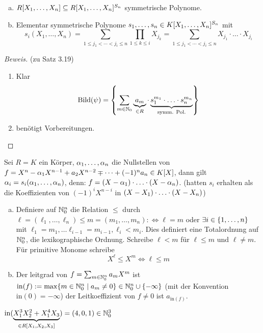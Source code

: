 \documentclass[a4paper]{report}
\begin{document}
\begin{whg*}\item
\begin{enumerate}[(a)]
  \item $R[X_{1}, \ldots, X_{n}] \subseteq R[X_{1}, \ldots, X_{n}]^{S_n}$ symmetrische Polynome.
  \item Elementar symmetrische Polynome $s_{1}, \ldots, s_{n} \in K[X_{1}, \ldots, X_{n}]^{S_n}$ mit \[s_{i}(X_{1}, \ldots, X_{n}) = \sum_{1 \le j_{1} < \cdots < j_{i} \le n}\prod_{1 \le k \le i}X_{j_{k}} = \sum_{1 \le j_{1} < \cdots < j_{i} \le n}X_{j_{1}}\cdot \ldots \cdot X_{j_{i}}\]
\end{enumerate}
\end{whg*}

\begin{proof}[Beweis](zu Satz 3.19)
\begin{enumerate}[{Teil} (a)]
  \item Klar
        \[\operatorname{Bild}(\psi) = \left\{ \sum_{m \in \mathbb{N}_0} \underbrace{a_{m}}_{\in R} \cdot \underbrace{s_{1}^{m_{1}}\cdot \ldots \cdot s_{n}^{m_{n}}}_{\text{symm. Pol.}} \right\}\]
  \item benötigt Vorbereitungen.
\end{enumerate}
\end{proof}

\begin{bem*}
Sei $R = K$ ein Körper, $\alpha_{1}, \ldots, \alpha_{n}$ die Nullstellen von $f = X^n - \alpha_{1}X^{n-1} + a_{2}X^{n-2} \mp \cdots + (-1)^{n}a_{n} \in K[X]$, dann gilt $\alpha_{i} = s_{i}(\alpha_{1}, \ldots, \alpha_{n})$, denn: $f = (X-\alpha_{1})\cdot \ldots \cdot (X-\alpha_{n})$. (hatten $s_{i}$ erhalten als die Koeffizienten von $(-1)^iX^{n-i}$ in $(X-X_{1})\cdot \ldots \cdot (X-X_{n})$)
\end{bem*}

\begin{defi}\item
\begin{enumerate}[(a)]
  \item Definiere auf $\mathbb{N}_0^{n}$ die Relation $\le$ durch $\ell = (\ell_{1}, \ldots, \ell_{n}) \le m = (m_{1}, \ldots, m_{n}) :\iff \ell = m$ oder $\exists i \in \{1, \ldots, n\}$ mit $\ell_{1} = m_{1}, \ldots \ell_{i-1} = m_{i-1}, \ell_{i} < m_{i}$. Dies definiert eine Totalordnung auf $\mathbb{N}_0^{n}$, die lexikographische Ordnung. Schreibe $\ell < m$ für $\ell \le m$ und $\ell \ne m$. Für primitive Monome schreibe
        \[X^{\ell} \le X^{m} \iff \ell \le m\]
  \item Der leitgrad von $f = \sum_{m \in \mathbb{N}_0^{n}}a_{m}X^{m}$ ist $\mathrm{in}(f):= \max \{m\in \mathbb{N}_0^{n} \mid a_{m} \ne 0\} \in \mathbb{N}_0^{n} \cup \{-\infty\}$ (mit der Konvention $\mathrm{in}(0) = -\infty$) der Leitkoeffizient von $f \ne 0$ ist $a_{\mathrm{in}(f)}$.
\end{enumerate}
\end{defi}
\begin{bsp*}
$\mathrm{in}(\underbrace{X_{1}^{3} X_{2}^{2} + X_{1}^{4}X_{3}}_{\in R[X_{1}, X_{2}, X_{3}]}) = (4, 0, 1) \in \mathbb{N}_0^{3}$
\end{bsp*}
\end{document}
